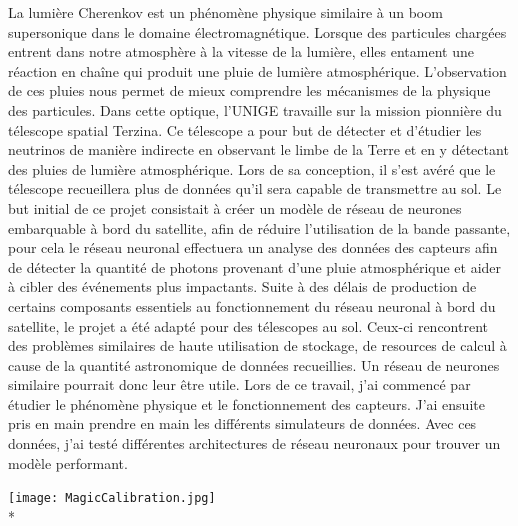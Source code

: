 \begin{spacing}{0.956}
\vspace{0.5cm}

La lumière Cherenkov est un phénomène physique similaire à un boom supersonique dans le domaine électromagnétique.
Lorsque des particules chargées entrent dans notre atmosphère à la vitesse de la lumière, 
elles entament une réaction en chaîne qui produit une pluie de lumière atmosphérique.
L’observation de ces pluies nous permet de mieux comprendre les mécanismes de la physique des particules. 
Dans cette optique, l’UNIGE travaille sur la mission pionnière du télescope spatial Terzina. 
Ce télescope a pour but de détecter et d’étudier les neutrinos de manière indirecte en observant le limbe de la Terre 
et en y détectant des pluies de lumière atmosphérique. Lors de sa conception, il s'est avéré 
que le télescope recueillera plus de données qu'il sera capable de transmettre au sol.
Le but initial de ce projet consistait à créer un modèle de réseau de neurones embarquable à bord du satellite,
afin de réduire l'utilisation de la bande passante, pour cela le réseau neuronal effectuera un analyse des données des capteurs
afin de détecter la quantité de photons provenant d'une pluie atmosphérique et aider à cibler des événements plus impactants.  
Suite à des délais de production de certains composants essentiels au fonctionnement du réseau neuronal à bord du satellite,
le projet a été adapté pour des télescopes au sol. Ceux-ci rencontrent des problèmes similaires de haute utilisation 
de stockage, de resources de calcul à cause de la quantité astronomique de données recueillies.
Un réseau de neurones similaire pourrait donc leur être utile.
Lors de ce travail, j'ai commencé par étudier le phénomène physique et le fonctionnement des capteurs. 
J'ai ensuite pris en main prendre en main les différents simulateurs de données. 
Avec ces données, j'ai testé différentes architectures de réseau neuronaux pour trouver un modèle performant.

\vfill
\begin{center}
	{\texttt{[image: MagicCalibration.jpg]}}\\*
\vfill


\end{center}
\end{spacing}
